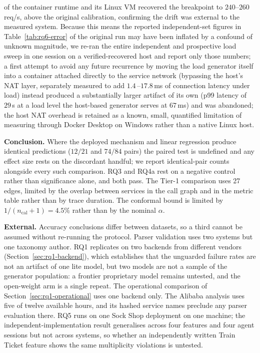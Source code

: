 \documentclass[journal, 10pt]{IEEEtran}
\begin{document}
of the container runtime and its Linux VM recovered the breakpoint to
$240$--$260\,$req/s, above the original calibration, confirming the drift was
external to the measured system. Because this means the reported independent-set
figures in Table~\ref{tab:rq6-error} of the original run may have been inflated
by a confound of unknown magnitude, we re-ran the entire independent and
prospective load sweep in one session on a verified-recovered host and report
only those numbers; a first attempt to avoid any future recurrence by moving the
load generator itself into a container attached directly to the service
network (bypassing the host's NAT layer, separately measured to add
$1.4\,$--$17.8\,$ms of connection latency under load) instead produced a
substantially larger artifact of its own (p99 latency of $29\,$s at a load
level the host-based generator serves at $67\,$ms) and was abandoned; the host
NAT overhead is retained as a known, small, quantified limitation of measuring
through Docker Desktop on Windows rather than a native Linux host.

\textbf{Conclusion.} Where the deployed mechanism and linear regression produce
identical predictions ($12/21$ and $74/84$ pairs) the paired test is undefined
and any effect size rests on the discordant handful; we report identical-pair
counts alongside every such comparison. RQ3 and RQ4a rest on a negative control
rather than significance alone, and both pass. The Tier-1 comparison uses 27
edges, limited by the overlap between services in the call graph and in the
metric table rather than by trace duration. The conformal bound is limited by
$1/(n_{\text{cal}}{+}1) = 4.5\%$ rather than by the nominal $\alpha$.

\textbf{External.} Accuracy conclusions differ between datasets, so a third
cannot be assumed without re-running the protocol. Parser validation uses two
systems but one taxonomy author. RQ1 replicates on two backends from different
vendors (Section~\ref{sec:rq1-backend}), which establishes that the unguarded
failure rates are not an artifact of one lite model, but two models are not a
sample of the generator population: a frontier proprietary model remains
untested, and the open-weight arm is a single repeat. The operational comparison
of Section~\ref{sec:rq1-operational} uses one backend only. The Alibaba
analysis uses five of twelve available hours, and its hashed service names
preclude any parser evaluation there. RQ5 runs on one Sock Shop deployment on
one machine; the independent-implementation result generalises across four
features and four agent sessions but not across systems, so whether an
independently written Train Ticket feature shows the same multiplicity
violations is untested.
\end{document}
